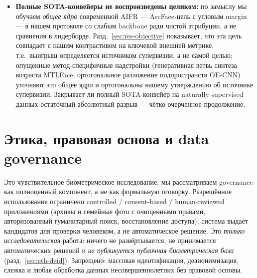 \documentclass[journal]{IEEEtran}
\begin{document}
\begin{itemize}[leftmargin=1.2em]
\item \textbf{Полные SOTA-конвейеры не воспроизведены целиком:} по замыслу мы обучаем \emph{общее ядро} современной AIFR --- ArcFace-цель с угловым margin --- в нашем протоколе со слабым backbone ради чистой атрибуции, а не сравнения в лидерборде. Разд.~\ref{sec:res-objective} показывает, что эта цель совпадает с нашим контрастивом на ключевой внешней метрике, т.е.\ выигрыш определяется источником супервизии, а не самой целью; опущенные метод-специфичные надстройки (генеративная ветвь синтеза возраста MTLFace, ортогональное разложение подпространств OE-CNN) уточняют это общее ядро и ортогональны нашему утверждению об источнике супервизии. Закрывает ли полный SOTA-конвейер на naturally-supervised данных остаточный абсолютный разрыв --- чётко очерченное продолжение.
\end{itemize}

\section{Этика, правовая основа и data governance}\label{sec:ethics}
Это чувствительное биометрическое исследование; мы рассматриваем governance как полноценный компонент, а не как формальную оговорку. Разрешённое использование ограничено controlled / consent-based / human-reviewed приложениями (архивы и семейные фото с очищенными правами, авторизованный гуманитарный поиск, восстановление доступа); система выдаёт кандидатов для проверки человеком, а не автоматическое решение. Это \emph{только исследовательская} работа: ничего не развёртывается, не принимается автоматических решений и \emph{не публикуется публичная биометрическая база} (разд.~\ref{sec:eth-deid}). Запрещено: массовая идентификация, деанонимизация, слежка и любая обработка данных несовершеннолетних без правовой основы.
\end{document}
